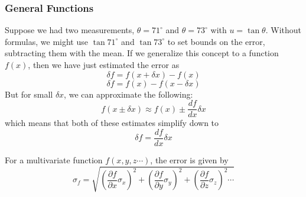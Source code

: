 \documentclass[../PhysicsFormulae.tex]{subfiles}
\begin{document}
\subsubsection{General Functions}
Suppose we had two measurements, $\theta = 71^{\circ}$ and $\theta = 73^{\circ}$ with $u = \tan{\theta}$. Without formulas, we might use $\tan{71^{\circ}}$ and $\tan{73^{\circ}}$ to set bounds on the error, subtracting them with the mean. If we generalize this concept to a function $f(x)$, then we have just estimated the error as 
\[ \delta f = f(x+\delta x) - f(x) \]
\[ \delta f = f(x) - f(x - \delta x) \]
But for small $\delta x$, we can approximate the following: 
\[ f(x \pm \delta x) \approx f(x) \pm \frac{df}{dx} \delta x \]
which means that both of these estimates simplify down to
\[ \delta f = \frac{df}{dx} \delta x \]

For a multivariate function $f(x, y, z \cdots)$, the error is given by 
\[ \sigma_f = \sqrt{\left(\frac{\partial f}{\partial x} \sigma_x \right)^2 + \left(\frac{\partial f}{\partial y} \sigma_y \right)^2 + \left(\frac{\partial f}{\partial z} \sigma_z \right)^2 \cdots } \]
\end{document}
